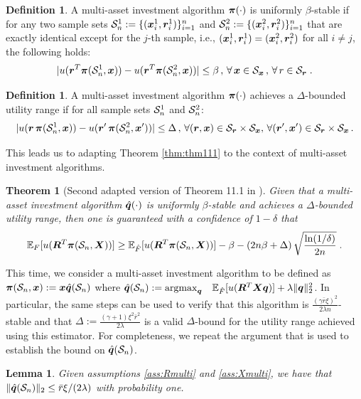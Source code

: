 \documentclass[]{interact}
\theoremstyle{plain}%
\newtheorem{lemma}[theorem]{Lemma}
\theoremstyle{definition}
\newtheorem{definition}[theorem]{Definition}
\theoremstyle{remark}
\def\Expect{{\mathbb E}}
\def\Prob{{\mathbb P}}
\def\argmax{\mathop{\rm argmax}}
\newcommand{\0}{\V{0}}
\newcommand{\1}{\V{1}}
\newcommand{\xMax}{\xi}
\theoremstyle{plain}
\newtheorem{thm}{Theorem}
\theoremstyle{definition}
\begin{document}
\begin{definition}
A multi-asset investment algorithm ${\boldsymbol{\pi}}(\cdot)$ is uniformly $\beta$-stable if for any two sample sets
  $\mathcal{S}_n^1:=\{({\boldsymbol{x}}_i^1,{\boldsymbol{r}}_i^1)\}_{i=1}^n$ and $\mathcal{S}_n^2:=\{({\boldsymbol{x}}_i^2,{\boldsymbol{r}}_i^2)\}_{i=1}^n$ that are
  exactly identical except for the $j$-th sample, i.e., $({\boldsymbol{x}}_i^1,{\boldsymbol{r}}_i^1)=({\boldsymbol{x}}_i^2,{\boldsymbol{r}}_i^2)$ for
  all $i\neq j$, the following holds:
  \[
    |u({\boldsymbol{r}}^T{\boldsymbol{\pi}}(\mathcal{S}_n^1, {\boldsymbol{x}})) - u({\boldsymbol{r}}^T{\boldsymbol{\pi}}(\mathcal{S}_n^2,{\boldsymbol{x}}))| \leq \beta\,,\,\forall\,{\boldsymbol{x}}\in{\mathcal{S}_{\boldsymbol{x}}}\,,\,\forall\,r\in{\mathcal{S}_{\boldsymbol{r}}}\;.
  \]
\end{definition}

\begin{definition}
A multi-asset investment algorithm ${\boldsymbol{\pi}}(\cdot)$ achieves a $\Delta$-bounded utility range if for all sample sets $\mathcal{S}_n^1$ and $\mathcal{S}_n^2$:
\[     |u({\boldsymbol{r}}\,{\boldsymbol{\pi}}(\mathcal{S}_n^1, {\boldsymbol{x}}))-u({\boldsymbol{r}}'\,{\boldsymbol{\pi}}(\mathcal{S}_n^2, {\boldsymbol{x}}'))| \leq \Delta\,,\,\forall ({\boldsymbol{r}},{\boldsymbol{x}})\in{\mathcal{S}_{\boldsymbol{r}}}\times {\mathcal{S}_{\boldsymbol{x}}},\,\forall({\boldsymbol{r}}',{\boldsymbol{x}}')\in{\mathcal{S}_{\boldsymbol{r}}}\times{\mathcal{S}_{\boldsymbol{x}}}\,.\]
\end{definition}


This leads us to adapting Theorem \ref{thm:thm111} to the context of multi-asset investment algorithms.

\begin{thm}[Second adapted version of Theorem 11.1 in \cite{mohri2012foundations}]\label{thm:thm111:multi}
  Given that a multi-asset investment algorithm ${\hat{\boldsymbol{q}}}(\cdot)$ is uniformly $\beta$-stable and achieves a $\Delta$-bounded utility range, then one
  is guaranteed with a confidence of $1-\delta$ that
  \[
    \Expect_{\F}[u(\vR^T\vinvestA(\Sn,\vX))] \geq \Expect_{\hat\F}[u(\vR^T\vinvestA(\Sn,\vX))] - \beta -
    \left(2n\beta+\Delta\right)\sqrt{\frac{\ln(1/\delta)}{2n}}\;.
  \]
\end{thm}

 This time, we consider a multi-asset investment algorithm to be defined as ${\boldsymbol{\pi}}(\mathcal{S}_n,{\boldsymbol{x}}):={\boldsymbol{x}}{\hat{\boldsymbol{q}}}(\mathcal{S}_n)$ where $\vqhat(\Sn):=\argmax_\vq \;\;\;\Expect_\Fhat[u(\vR^T\vX \vq)]+\lambda\|\vq\|_2^2$. In particular, the same steps can be used to verify that this algorithm is $\frac{(\gamma\bar r\xMax)^2}{2\lambda n}$-stable and that $\Delta:=\frac{(\gamma+1)\xi^2
      \bar{r}^2}{2\lambda}$ is a valid $\Delta$-bound for the utility range achieved using this estimator. For completeness, we repeat the argument that is used to establish the bound on ${\hat{\boldsymbol{q}}}(\mathcal{S}_n)$.

\begin{lemma}\label{thm:qhatBoundMulti}
Given assumptions \ref{ass:Rmulti} and \ref{ass:Xmulti}, we have that $\|{\hat{\boldsymbol{q}}}(\mathcal{S}_n)\|_2 \leq \bar{r}\xi/(2\lambda)$ with probability one.
\end{lemma}
\end{document}
